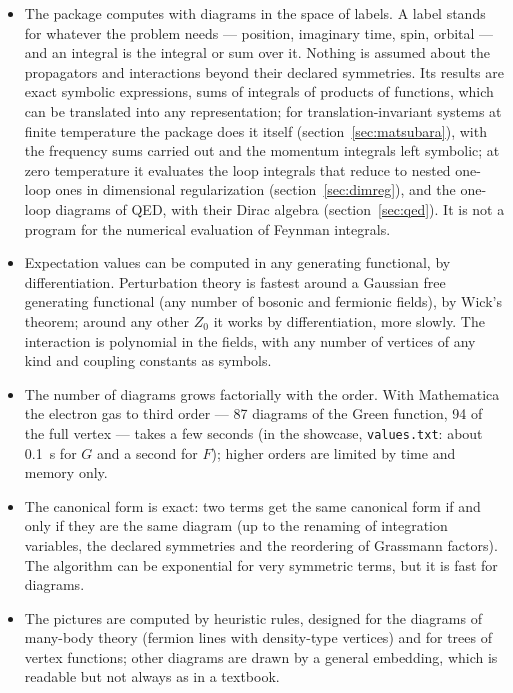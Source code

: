 \documentclass[11pt,a4paper]{article}
\newcommand{\pkg}[1]{\texttt{#1}}
\begin{document}
\begin{itemize}
\item The package computes with diagrams in the space of labels. A label stands for whatever the problem needs ---
  position, imaginary time, spin, orbital --- and an integral is the integral or sum over it. Nothing is assumed about
  the propagators and interactions beyond their declared symmetries. Its results are exact symbolic expressions, sums of
  integrals of products of functions, which can be translated into any representation; for translation-invariant systems
  at finite temperature the package does it itself (section~\ref{sec:matsubara}), with the frequency sums carried out and
  the momentum integrals left symbolic; at zero temperature it evaluates the loop integrals that reduce to nested
  one-loop ones in dimensional regularization (section~\ref{sec:dimreg}), and the one-loop diagrams of QED, with their
  Dirac algebra (section~\ref{sec:qed}). It is not a program for the numerical evaluation of Feynman integrals.
\item Expectation values can be computed in any generating functional, by differentiation. Perturbation theory is
  fastest around a Gaussian free generating functional (any number of bosonic and fermionic fields), by Wick's theorem;
  around any other $Z_0$ it works by differentiation, more slowly. The interaction is polynomial in the
  fields, with any number of vertices of any kind and coupling constants as symbols.
\item The number of diagrams grows factorially with the order. With Mathematica the electron gas to third order --- 87
  diagrams of the Green function, 94 of the full vertex --- takes a few seconds (in the showcase, \pkg{values.txt}: about 0.1~s for $G$ and a second for $F$); higher orders are limited by time
  and memory only.
\item The canonical form is exact: two terms get the same canonical form if and only if they are the same diagram (up to
  the renaming of integration variables, the declared symmetries and the reordering of Grassmann factors). The algorithm
  can be exponential for very symmetric terms, but it is fast for diagrams.
\item The pictures are computed by heuristic rules, designed for the diagrams of many-body theory (fermion lines with
  density-type vertices) and for trees of vertex functions; other diagrams are drawn by a general embedding, which is
  readable but not always as in a textbook.
\end{itemize}
\end{document}
